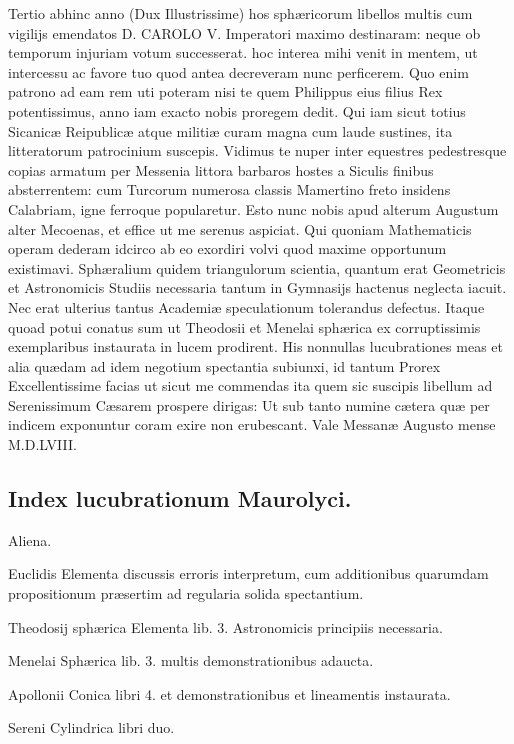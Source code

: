 \documentclass[11pt,a4paper]{article}
\begin{document}
Tertio abhinc anno (Dux Illustrissime) hos sphæricorum libellos multis cum vigilijs emendatos D. CAROLO V. Imperatori maximo destinaram: neque ob temporum injuriam votum successerat. hoc interea mihi venit in mentem, ut intercessu ac favore tuo quod antea decreveram nunc perficerem. Quo enim patrono ad eam rem uti poteram nisi te quem Philippus eius filius Rex potentissimus, anno iam exacto nobis proregem dedit. Qui iam sicut totius Sicanicæ Reipublicæ atque militiæ curam magna cum laude sustines, ita litteratorum patrocinium suscepis. Vidimus te nuper inter equestres pedestresque copias armatum per Messenia littora barbaros hostes a Siculis finibus absterrentem: cum Turcorum numerosa classis Mamertino freto insidens Calabriam, igne ferroque popularetur. Esto nunc nobis apud alterum Augustum alter Mecoenas, et effice ut me serenus aspiciat. Qui quoniam Mathematicis operam dederam idcirco ab eo exordiri volvi quod maxime opportunum existimavi. Sphæralium quidem triangulorum scientia, quantum erat Geometricis et Astronomicis Studiis necessaria tantum in Gymnasijs hactenus neglecta iacuit. Nec erat ulterius tantus Academiæ speculationum tolerandus defectus. Itaque quoad potui conatus sum ut Theodosii et Menelai sphærica ex corruptissimis exemplaribus instaurata in lucem prodirent. His nonnullas lucubrationes meas et alia quædam ad idem negotium spectantia subiunxi, id tantum Prorex Excellentissime facias ut sicut me commendas ita quem sic suscipis libellum ad Serenissimum Cæsarem prospere dirigas: Ut sub tanto numine cætera quæ per indicem exponuntur coram exire non erubescant. Vale Messanæ Augusto mense M.D.LVIII.

\subsection*{Index lucubrationum Maurolyci.}

Aliena.

Euclidis Elementa discussis erroris interpretum, cum additionibus quarumdam propositionum præsertim ad regularia solida spectantium.

Theodosij sphærica Elementa lib. 3. Astronomicis principiis necessaria.

Menelai Sphærica lib. 3. multis demonstrationibus adaucta.

Apollonii Conica libri 4. et demonstrationibus et lineamentis instaurata.

Sereni Cylindrica libri duo.
\end{document}

